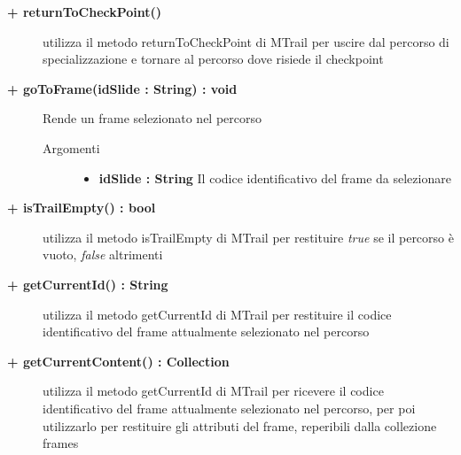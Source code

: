 \begin{description}
	\begin{description}
		\item[\textbf{\color{blue}+ returnToCheckPoint()			}] \hfill
			utilizza il metodo returnToCheckPoint di MTrail per uscire dal percorso di specializzazione e tornare al percorso dove risiede il checkpoint
	\end{description}
	
	\begin{description}
		\item[\textbf{\color{blue}+ goToFrame(idSlide : String) : void			}] \hfill
			Rende un frame selezionato nel percorso
			
		\begin{description}
			\item[Argomenti] \hfill
				\begin{itemize}
				
					\item \textbf{idSlide : String			} \hfill
					Il codice identificativo del frame da selezionare
					
				\end{itemize}
			
		\end{description}
	\end{description}
	
	
	\begin{description}
		\item[\textbf{\color{blue}+ isTrailEmpty() : bool		}] \hfill
			utilizza il metodo isTrailEmpty di MTrail per restituire \textit{true} se il percorso è vuoto, \textit{false} altrimenti
	\end{description}
	
	\begin{description}
		\item[\textbf{\color{blue}+ getCurrentId() : String		}] \hfill
			utilizza il metodo getCurrentId di MTrail per restituire il codice identificativo del frame attualmente selezionato nel percorso
	\end{description}
	
	\begin{description}
		\item[\textbf{\color{blue}+ getCurrentContent() : Collection		}] \hfill
			utilizza il metodo getCurrentId di MTrail per ricevere il codice identificativo del frame attualmente selezionato nel percorso, per poi utilizzarlo per restituire gli attributi del frame, reperibili dalla collezione frames
	\end{description}
	

\end{description}
